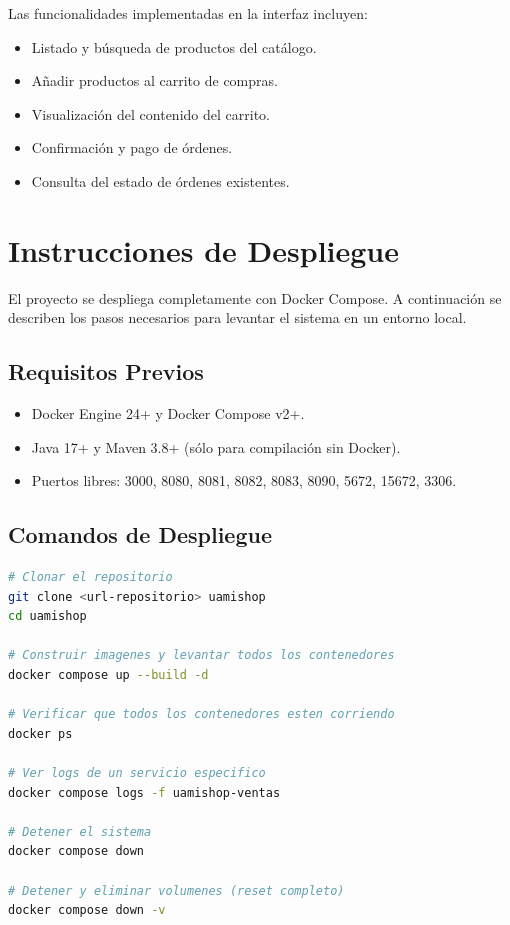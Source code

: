 \documentclass[12pt,a4paper]{article}
\begin{document}
Las funcionalidades implementadas en la interfaz incluyen:

\begin{itemize}
  \item Listado y b\'usqueda de productos del cat\'alogo.
  \item A\~nadir productos al carrito de compras.
  \item Visualizaci\'on del contenido del carrito.
  \item Confirmaci\'on y pago de \'ordenes.
  \item Consulta del estado de \'ordenes existentes.
\end{itemize}

\section{Instrucciones de Despliegue}

El proyecto se despliega completamente con Docker Compose. A continuaci\'on se describen
los pasos necesarios para levantar el sistema en un entorno local.

\subsection{Requisitos Previos}

\begin{itemize}
  \item Docker Engine 24+ y Docker Compose v2+.
  \item Java 17+ y Maven 3.8+ (s\'olo para compilaci\'on sin Docker).
  \item Puertos libres: 3000, 8080, 8081, 8082, 8083, 8090, 5672, 15672, 3306.
\end{itemize}

\subsection{Comandos de Despliegue}

\begin{lstlisting}[language=bash, caption={Levantar el sistema completo}]
# Clonar el repositorio
git clone <url-repositorio> uamishop
cd uamishop

# Construir imagenes y levantar todos los contenedores
docker compose up --build -d

# Verificar que todos los contenedores esten corriendo
docker ps

# Ver logs de un servicio especifico
docker compose logs -f uamishop-ventas

# Detener el sistema
docker compose down

# Detener y eliminar volumenes (reset completo)
docker compose down -v
\end{lstlisting}
\end{document}
